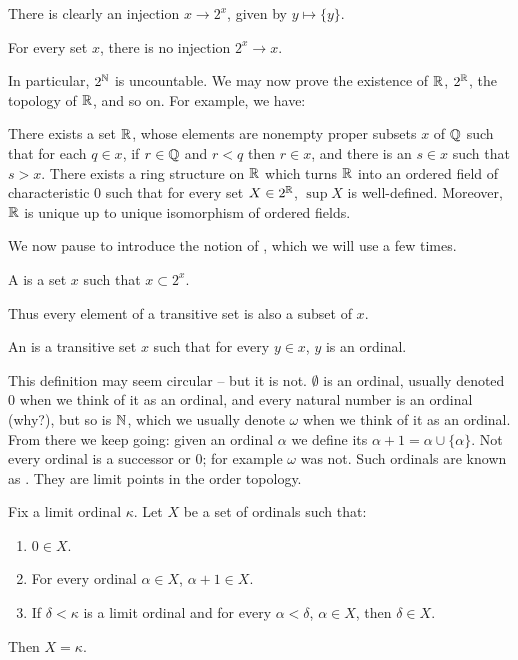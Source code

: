 There is clearly an injection $x \to 2^x$, given by $y \mapsto \{y\}$.
\begin{theorem}
For every set $x$, there is no injection $2^x \to x$.
\end{theorem}
In particular, $2^{\mathbb{N}}$ is uncountable.
We may now prove the existence of $\mathbb{R}$, $2^{\mathbb{R}}$, the topology of $\mathbb{R}$, and so on. For example, we have:
\begin{theorem}[Dedekind]
There exists a set $\mathbb{R}$, whose elements are nonempty proper subsets $x$ of $\mathbb{Q}$ such that for each $q \in x$, if $r \in \mathbb{Q}$ and $r < q$ then $r \in x$, and there is an $s \in x$ such that $s > x$.
There exists a ring structure on $\mathbb{R}$ which turns $\mathbb{R}$ into an ordered field of characteristic $0$ such that for every set $X \in 2^{\mathbb{R}}$, $\sup X$ is well-defined.
Moreover, $\mathbb{R}$ is unique up to unique isomorphism of ordered fields.
\end{theorem}
We now pause to introduce the notion of , which we will use a few times.
\begin{definition}
A  is a set $x$ such that $x \subset 2^x$.
\end{definition}
Thus every element of a transitive set is also a subset of $x$.
\begin{definition}
\label{ordinal dfn}
An  is a transitive set $x$ such that for every $y \in x$, $y$ is an ordinal.
\end{definition}
This definition may seem circular -- but it is not. $\emptyset$ is an ordinal, usually denoted $0$ when we think of it as an ordinal, and every natural number is an ordinal (why?), but so is $\mathbb{N}$, which we usually denote $\omega$ when we think of it as an ordinal.
From there we keep going: given an ordinal $\alpha$ we define its  $\alpha + 1 = \alpha \cup \{\alpha\}$.
Not every ordinal is a successor or $0$; for example $\omega$ was not. Such ordinals are known as .
They are limit points in the order topology.
\begin{theorem}
\label{transfinite induction}
Fix a limit ordinal $\kappa$. Let $X$ be a set of ordinals such that:
\begin{enumerate}
\item $0 \in X$.
\item For every ordinal $\alpha \in X$, $\alpha + 1 \in X$.
\item If $\delta < \kappa$ is a limit ordinal and for every $\alpha < \delta$, $\alpha \in X$, then $\delta \in X$.
\end{enumerate}
Then $X = \kappa$.
\end{theorem}
